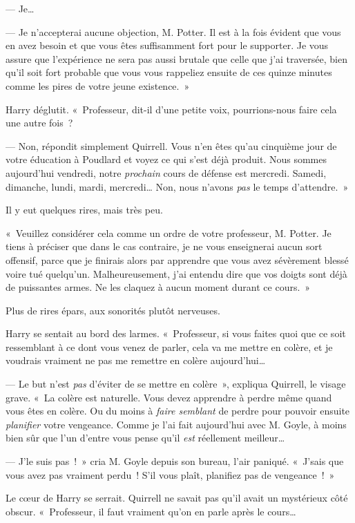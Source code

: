 --- Je…

--- Je n'accepterai aucune objection, M. Potter.
Il est à la fois évident que vous en avez besoin et que vous êtes suffisamment fort pour le supporter.
Je vous assure que l'expérience ne sera pas aussi brutale que celle que j'ai traversée, bien qu'il soit fort probable que vous vous rappeliez ensuite de ces quinze minutes comme les pires de votre jeune existence.~»

Harry déglutit.
«~Professeur, dit-il d'une petite voix, pourrions-nous faire cela une autre fois~?

--- Non, répondit simplement Quirrell.
Vous n'en êtes qu'au cinquième jour de votre éducation à Poudlard et voyez ce qui s'est déjà produit.
Nous sommes aujourd'hui vendredi, notre \emph{prochain} cours de défense est mercredi.
Samedi, dimanche, lundi, mardi, mercredi…
Non, nous n'avons \emph{pas} le temps d'attendre.~»

Il y eut quelques rires, mais très peu.

«~Veuillez considérer cela comme un ordre de votre professeur, M. Potter.
Je tiens à préciser que dans le cas contraire, je ne vous enseignerai aucun sort offensif, parce que je finirais alors par apprendre que vous avez sévèrement blessé voire tué quelqu'un.
Malheureusement, j'ai entendu dire que vos doigts sont déjà de puissantes armes.
Ne les claquez à aucun moment durant ce cours.~»

Plus de rires épars, aux sonorités plutôt nerveuses.

Harry se sentait au bord des larmes.
«~Professeur, si vous faites quoi que ce soit ressemblant à ce dont vous venez de parler, cela va me mettre en colère, et je voudrais vraiment ne pas me remettre en colère aujourd'hui…

--- Le but n'est \emph{pas} d'éviter de se mettre en colère~», expliqua Quirrell, le visage grave.
«~La colère est naturelle.
Vous devez apprendre à perdre même quand vous êtes en colère.
Ou du moins à \emph{faire semblant} de perdre pour pouvoir ensuite \emph{planifier} votre vengeance.
Comme je l'ai fait aujourd'hui avec M. Goyle, à moins bien sûr que l'un d'entre vous pense qu'il \emph{est} réellement meilleur…

--- J'le suis pas~!~»
cria M. Goyle depuis son bureau, l'air paniqué.
«~J'sais que vous avez pas vraiment perdu~!
S'il vous plaît, planifiez pas de vengeance~!~»

Le cœur de Harry se serrait.
Quirrell ne savait pas qu'il avait un mystérieux côté obscur.
«~Professeur, il faut vraiment qu'on en parle après le cours…

